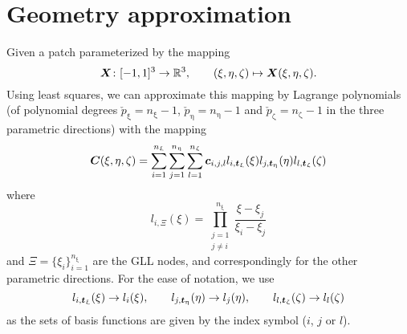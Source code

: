 \section{Geometry approximation}
Given a patch parameterized by the mapping
\begin{equation*}
	\vec{X}\colon [-1,1]^3 \to \R^3, \qquad (\xi,\eta,\zeta) \mapsto \vec{X}(\xi,\eta,\zeta).
\end{equation*}
Using least squares, we can approximate this mapping by Lagrange polynomials (of polynomial degrees $\check{p}_\upxi=n_\upxi-1$, $\check{p}_\upeta=n_\upeta-1$ and $\check{p}_\upzeta=n_\upzeta-1$ in the three parametric directions) with the mapping
\begin{equation*}
	\vec{C}(\xi,\eta,\zeta) = \sum_{i=1}^{n_\upxi}\sum_{j=1}^{n_\upeta}\sum_{l=1}^{n_\upzeta}\vec{c}_{i,j,l} l_{i,\Xi}(\xi)l_{j,\Eta}(\eta)l_{l,\Zeta}(\zeta)
\end{equation*}
where
\begin{equation*}
	l_{i,\Xi}(\xi) = \prod_{\substack{j = 1 \\ j\neq i}}^{n_\upxi}\frac{\xi-\xi_j}{\xi_i-\xi_j}
\end{equation*}
and $\Xi = \{\xi_i\}_{i=1}^{n_\upxi}$ are the GLL nodes, and correspondingly for the other parametric directions. For the ease of notation, we use
\begin{equation*}
	l_{i,\Xi}(\xi)\to l_i(\xi),\qquad l_{j,\Eta}(\eta)\to l_j(\eta),\qquad l_{l,\Zeta}(\zeta)\to l_l(\zeta)
\end{equation*}
as the sets of basis functions are given by the index symbol ($i$, $j$ or $l$).

